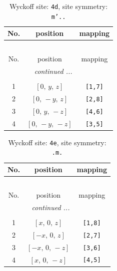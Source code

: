 \documentclass[fleqn,8pt]{jsarticle}
\begin{document}
\begin{longtable}{ccc}
\caption{Wyckoff site: {\tt 4d}, site symmetry: {\tt m'..}}
 \\
 \hline \hline
No. & position & mapping \\ \hline \endfirsthead

\multicolumn{2}{l}{\tablename\ \thetable{}} \\
 \hline \hline
No. & position & mapping \\ \hline \endhead

 \hline \hline
\multicolumn{2}{r}{\footnotesize\it continued ...} \\ \endfoot

 \hline \hline
\multicolumn{2}{r}{} \\ \endlastfoot

1 & $\left[ 0,\, y,\, z \right]$ & {\tt [1,7]} \\ \hline
2 & $\left[ 0,\, - y,\, z \right]$ & {\tt [2,8]} \\ \hline
3 & $\left[ 0,\, y,\, - z \right]$ & {\tt [4,6]} \\ \hline
4 & $\left[ 0,\, - y,\, - z \right]$ & {\tt [3,5]} \\
\end{longtable}
\renewcommand{\arraystretch}{1.2}
\begin{longtable}{ccc}
\caption{Wyckoff site: {\tt 4e}, site symmetry: {\tt .m.}}
 \\
 \hline \hline
No. & position & mapping \\ \hline \endfirsthead

\multicolumn{2}{l}{\tablename\ \thetable{}} \\
 \hline \hline
No. & position & mapping \\ \hline \endhead

 \hline \hline
\multicolumn{2}{r}{\footnotesize\it continued ...} \\ \endfoot

 \hline \hline
\multicolumn{2}{r}{} \\ \endlastfoot

1 & $\left[ x,\, 0,\, z \right]$ & {\tt [1,8]} \\ \hline
2 & $\left[ - x,\, 0,\, z \right]$ & {\tt [2,7]} \\ \hline
3 & $\left[ - x,\, 0,\, - z \right]$ & {\tt [3,6]} \\ \hline
4 & $\left[ x,\, 0,\, - z \right]$ & {\tt [4,5]} \\
\end{longtable}
\renewcommand{\arraystretch}{1.2}
\end{document}
